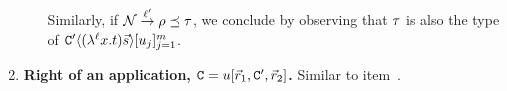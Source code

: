 \begin{enumerate}
\begin{enumerate}
      Similarly, if $\mathcal{N} \overset{\ell'}{\to} \rho \preceq \tau$,
      we conclude by observing
      that $\tau$ is also the type of $\mathtt{C}'\langle(\lambda^{\ell} x. t)\vec{s}\rangle[u_j]_{j=1}^m$.
    \end{enumerate}
  \item {\bf Right of an application, $\mathtt{C} = u[\vec{r}_1,\mathtt{C}',\vec{r}_2]$.}
    Similar to item~.
  \end{enumerate}

